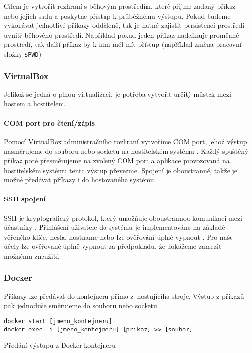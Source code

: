 Cílem je vytvořit rozhraní s běhovým prostředím, které přijme zadaný příkaz nebo jejich sadu a poskytne přístup k průběžnému výstupu.
Pokud budeme vykonávat jednotlivé příkazy odděleně, tak je nutné zajistit persistenci prostředí uvnitř běhového prostředí.
Například pokud jeden příkaz nadefinuje proměnné prostředí, tak další příkaz by k nim měl mít přístup (například změna pracovní složky \verb|$PWD|).

\subsubsection{VirtualBox}

Jelikož se jedná o plnou virtualizaci, je potřeba vytvořit určitý můstek mezi hostem a hostitelem.

\paragraph{COM port pro čtení/zápis}

Pomocí VirtualBox administračního rozhraní vytvoříme COM port, jehož výstup nasměrujeme do souboru nebo socketu na hostitelském systému \cite{virtualbox_serial}.
Každý spuštěný příkaz poté přesměrujeme na zvolený COM port a aplikace provozovaná na hostitelském systému tento výstup převezme.
Spojení je oboustranné, takže je možné předávat příkazy i do hostovaného systému.

\paragraph{SSH spojení}

SSH je kryptografický protokol, který umožňuje oboustrannou komunikaci mezi účastníky \cite{ssh_rfc}.
Přihlášení uživatele do systému je implementováno na základě věřeného klíče, hesla, hostname nebo lze ověřování úplně vypnout \cite{ssh_auth_rfc}.
Pro naše účely lze ověřované úplně vypnout za předpokladu, že dokážeme zamezit možnému zneužití.

\subsubsection{Docker}

Příkazy lze předávat do kontejneru přímo z~hostujícího stroje.
Výstup z příkazů pak jednoduše směrujeme do souboru nebo socketu.

\begin{listing}[ht]
\begin{verbatim}
docker start [jmeno_kontejneru]
docker exec -i [jmeno_kontejneru] [prikaz] >> [soubor]
\end{verbatim}
\caption{Předání výstupu z Docker kontejneru}
\end{listing}

